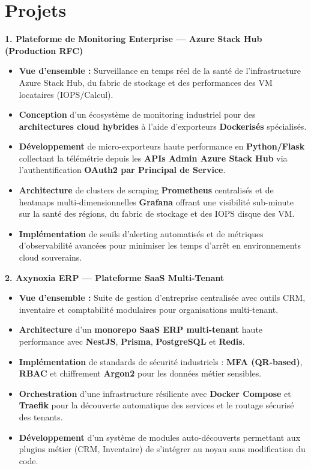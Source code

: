 \documentclass[10pt, letterpaper]{article}
\newenvironment{highlights}{
\begin{itemize}[leftmargin=12pt, itemsep=2pt]
}{
\end{itemize}
}
\begin{document}
\section{Projets}

\textbf{1. Plateforme de Monitoring Enterprise --- Azure Stack Hub (Production RFC)}
\begin{highlights}
\item \textbf{Vue d'ensemble :} Surveillance en temps réel de la santé de l'infrastructure Azure Stack Hub, du fabric de stockage et des performances des VM locataires (IOPS/Calcul).
\item \textbf{Conception} d'un écosystème de monitoring industriel pour des \textbf{architectures cloud hybrides} à l'aide d'exporteurs \textbf{Dockerisés} spécialisés.
\item \textbf{Développement} de micro-exporteurs haute performance en \textbf{Python/Flask} collectant la télémétrie depuis les \textbf{APIs Admin Azure Stack Hub} via l'authentification \textbf{OAuth2 par Principal de Service}.
\item \textbf{Architecture} de clusters de scraping \textbf{Prometheus} centralisés et de heatmaps multi-dimensionnelles \textbf{Grafana} offrant une visibilité sub-minute sur la santé des régions, du fabric de stockage et des IOPS disque des VM.
\item \textbf{Implémentation} de seuils d'alerting automatisés et de métriques d'observabilité avancées pour minimiser les temps d'arrêt en environnements cloud souverains.
\end{highlights}

\textbf{2. Axynoxia ERP --- Plateforme SaaS Multi-Tenant}
\begin{highlights}
\item \textbf{Vue d'ensemble :} Suite de gestion d'entreprise centralisée avec outils CRM, inventaire et comptabilité modulaires pour organisations multi-tenant.
\item \textbf{Architecture} d'un \textbf{monorepo SaaS ERP multi-tenant} haute performance avec \textbf{NestJS}, \textbf{Prisma}, \textbf{PostgreSQL} et \textbf{Redis}.
\item \textbf{Implémentation} de standards de sécurité industriels : \textbf{MFA (QR-based)}, \textbf{RBAC} et chiffrement \textbf{Argon2} pour les données métier sensibles.
\item \textbf{Orchestration} d'une infrastructure résiliente avec \textbf{Docker Compose} et \textbf{Traefik} pour la découverte automatique des services et le routage sécurisé des tenants.
\item \textbf{Développement} d'un système de modules auto-découverts permettant aux plugins métier (CRM, Inventaire) de s'intégrer au noyau sans modification du code.
\end{highlights}
\end{document}
